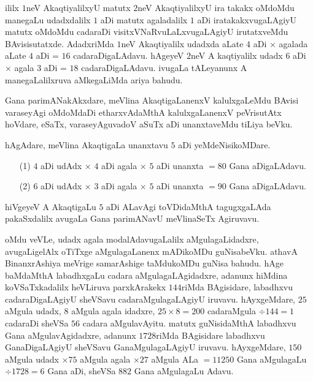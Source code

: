 ililx $1$neV AkaqtiyalilxyU matutx $2$neV AkaqtiyalilxyU ira takakx
oMdoMdu manegaLu udadxdalilx $1$ aDi matutx agaladalilx $1$ aDi
iratakakxvugaLAgiyU matutx oMdoMdu cadaraDi visitxVNaRvuLaLxvugaLAgiyU
irutatxveMdu BAvisisutatxde. AdadxriMda $1$neV Akaqtiyalilx udadxda
aLate $4$ aDi $\times$ agalada aLate $4$ aDi = $16$
cadaraDigaLAdavu. hAgeyeV $2$neV A kaqtiyalilx udadx $6$ aDi $\times$
agala $3$ aDi = $18$ cadaraDigaLAdavu. ivugaLa tALeyanunx A
manegaLalilxruva aMkegaLiMda ariya bahudu. 

Gana parimANakAkxdare, meVlina AkaqtigaLanenxV kalulxgaLeMdu BAvisi
varaseyAgi oMdoMdaDi etharxvAdaMthA kalulxgaLanenxV peVrisutAtx
hoVdare, eSaTx, varaseyAguvadoV aSuTx aDi unanxtaveMdu tiLiya beVku.

hAgAdare, meVlina AkaqtigaLa unanxtavu $5$ aDi yeMdeNisikoMDare.
\begin{itemize}
\item[\rm(1)] $4$ aDi udAdx $\times$ $4$ aDi agala $\times$ $5$ aDi
  unanxta $=80$ Gana aDigaLAdavu.

\item[\rm(2)] $6$ aDi udAdx $\times$ $3$ aDi agala $\times$ $5$ aDi
  unanxta $=90$ Gana aDigaLAdavu.
\end{itemize}

hiVgeyeV A AkaqtigaLu $5$ aDi ALavAgi toVDidaMthA tagugxgaLAda
pakaSxdalilx avugaLa Gana parimANavU meVlinaSeTx Agiruvavu.

oMdu veVLe, udadx agala modalAdavugaLalilx aMgulagaLidadxre,
avugaLigelAlx oTiTxge aMgulagaLanenx mADikoMDu guNisabeVku. athavA
BinanxrAshiya meVrige samarAshige taMdukoMDu guNisa bahudu. hAge
baMdaMthA labadhxgaLu cadara aMgulagaLAgidadxre, adanunx hiMdina
koVSaTxkadalilx heVLiruva parxkArakekx $144$riMda BAgisidare,
labadhxvu cadaraDigaLAgiyU sheVSavu cadaraMgulagaLAgiyU
iruvavu. hAyxgeMdare, $25$ aMgula udadx, $8$ aMgula agala idadxre,
$25\times 8=200$ cadaraMgula $\div 144=1$ cadaraDi sheVSa $56$ cadara
aMgulavAyitu. matutx guNisidaMthA \hbox{labadhxvu} Gana aMgulavAgidadxre,
adanunx $1728$riMda BAgisidare labadhxvu GanaDigaLAgiyU sheVSavu
GanaMgulagaLAgiyU iruvavu. hAyxgeMdare, $150$ aMgula udadx $\times 75$
aMgula agala $\times 27$ aMgula ALa $=11250$ Gana aMgulagaLu $\div
1728=6$ Gana aDi, sheVSa $882$ Gana aMgulagaLu Adavu.

